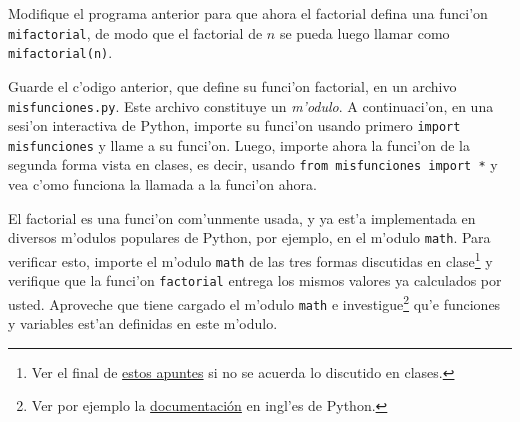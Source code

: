 \documentclass[11pt]{exam}
\begin{document}
\begin{questions}
\item Modifique el programa anterior para que ahora el factorial defina una funci'on \texttt{mifactorial}, de modo que el factorial de $n$ se pueda luego llamar como \texttt{mifactorial(n)}.

\item Guarde el c'odigo anterior, que define su funci'on factorial, en un archivo \texttt{misfunciones.py}. Este archivo constituye un \textit{m'odulo}. A continuaci'on, en una sesi'on interactiva de Python, importe su funci'on usando primero \texttt{import misfunciones} y llame a su funci'on. Luego, importe ahora la funci'on de la segunda forma vista en clases, es decir, usando \texttt{from misfunciones import *} y vea c'omo funciona la llamada a la funci'on ahora.

\item El factorial es una funci'on com'unmente usada, y ya est'a implementada en diversos m'odulos populares de Python, por ejemplo, en el m'odulo \texttt{math}. Para verificar esto, importe el m'odulo \texttt{math} de las tres formas discutidas en clase\footnote{Ver el final de \href{http://nbviewer.ipython.org/github/gfrubi/clases-python-cientifico/blob/master/Lecture-1-Introduction-to-Python-Programming.ipynb}{estos apuntes} si no se acuerda lo discutido en clases.} y verifique que la funci'on \texttt{factorial} entrega los mismos valores ya calculados por usted. Aproveche que tiene cargado el m'odulo \texttt{math} e investigue\footnote{Ver por ejemplo la \href{https://docs.python.org/2/library/math.html}{documentaci\'on} en ingl'es de Python.} qu'e funciones y variables est'an definidas en este m'odulo.
\end{questions}
\end{document}
